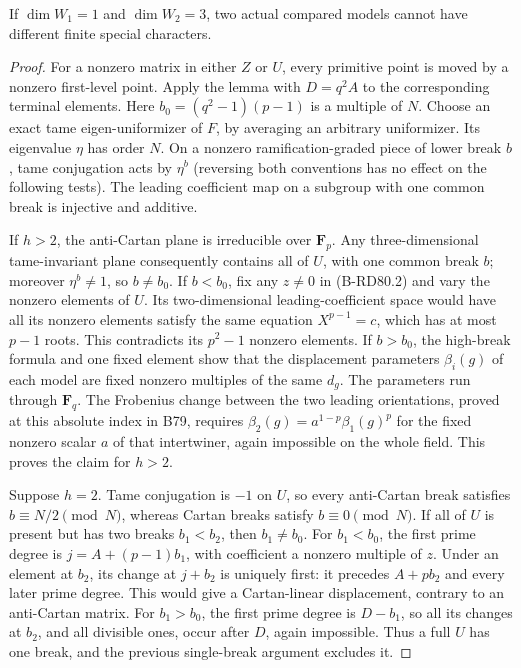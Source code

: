 \begin{proposition}
\label{prop:B-RD80-three-terminal}
If \(\dim W_1=1\) and \(\dim W_2=3\), two actual compared models
cannot have different finite special characters.
\end{proposition}
\begin{proof}
For a nonzero matrix in either \(Z\) or \(U\), every primitive
point is moved by a nonzero first-level point. Apply the lemma
with \(D=q^2A\) to the corresponding terminal elements.
Here \(b_0=(q^2-1)(p-1)\) is a multiple of \(N\).
Choose an exact tame eigen-uniformizer of \(F\), by averaging
an arbitrary uniformizer. Its eigenvalue \(\eta\) has order \(N\).
On a nonzero ramification-graded piece of lower break \(b\),
tame conjugation acts by \(\eta^b\) (reversing both conventions
has no effect on the following tests). The leading coefficient
map on a subgroup with one common break is injective and additive.

If \(h>2\), the anti-Cartan plane is irreducible over \(\mathbf F_p\).
Any three-dimensional tame-invariant plane consequently contains
all of \(U\), with one common break \(b\); moreover \(\eta^b\ne1\),
so \(b\ne b_0\). If \(b<b_0\), fix any \(z\ne0\) in (B-RD80.2)
and vary the nonzero elements of \(U\). Its two-dimensional
leading-coefficient space would have all its nonzero elements
satisfy the same equation \(X^{p-1}=c\), which has at most
\(p-1\) roots. This contradicts its \(p^2-1\) nonzero elements.
If \(b>b_0\), the high-break formula and one fixed element show
that the displacement parameters \(\beta_i(g)\) of each model
are fixed nonzero multiples of the same \(d_g\). The parameters
run through \(\mathbf F_q\). The Frobenius change between the
two leading orientations, proved at this absolute index in B79,
requires \(\beta_2(g)=a^{1-p}\beta_1(g)^p\) for the fixed
nonzero scalar \(a\) of that intertwiner, again impossible on the
whole field.
This proves the claim for \(h>2\).

Suppose \(h=2\). Tame conjugation is \(-1\) on \(U\), so every
anti-Cartan break satisfies \(b\equiv N/2\pmod N\), whereas
Cartan breaks satisfy \(b\equiv0\pmod N\). If all of \(U\)
is present but has two breaks \(b_1<b_2\), then \(b_1\ne b_0\).
For \(b_1<b_0\), the first prime degree is
\(j=A+(p-1)b_1\), with coefficient a nonzero multiple of \(z\).
Under an element at \(b_2\), its change at \(j+b_2\) is uniquely
first: it precedes \(A+pb_2\) and every later prime degree.
This would give a Cartan-linear displacement, contrary to an
anti-Cartan matrix. For \(b_1>b_0\), the first prime degree is
\(D-b_1\), so all its changes at \(b_2\), and all divisible
ones, occur after \(D\), again impossible. Thus a full \(U\)
has one break, and the previous single-break argument excludes it.


\end{proof}

